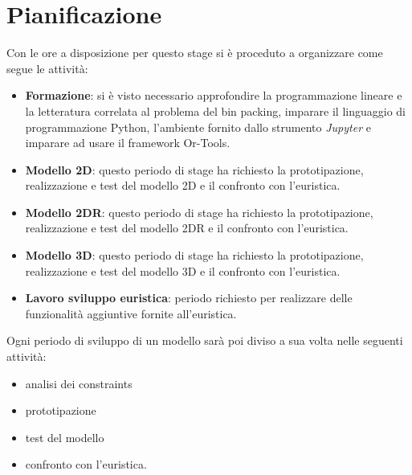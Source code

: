 \section{Pianificazione}
Con le ore a disposizione per questo stage si è proceduto a organizzare come segue le attività:
\begin{itemize}
	\item \textbf{Formazione}: si è visto necessario approfondire la programmazione lineare e la letteratura correlata al problema del bin packing, imparare il linguaggio di programmazione Python, l'ambiente fornito dallo strumento \textit{Jupyter} e imparare ad usare il framework Or-Tools.
	\item \textbf{Modello 2D}: questo periodo di stage ha richiesto la prototipazione, realizzazione e test del modello 2D e il confronto con l'euristica.
	\item \textbf{Modello 2DR}: questo periodo di stage ha richiesto la prototipazione, realizzazione e test del modello 2DR e il confronto con l'euristica.
	\item \textbf{Modello 3D}: questo periodo di stage ha richiesto la prototipazione, realizzazione e test del modello 3D e il confronto con l'euristica.
	\item \textbf{Lavoro sviluppo euristica}: periodo richiesto per realizzare delle funzionalità aggiuntive fornite all'euristica.
\end{itemize}

Ogni periodo di sviluppo di un modello sarà poi diviso a sua volta nelle seguenti attività:
\begin{itemize}
	\item analisi dei constraints
	\item prototipazione 
	\item test del modello
	\item confronto con l'euristica.
\end{itemize}

